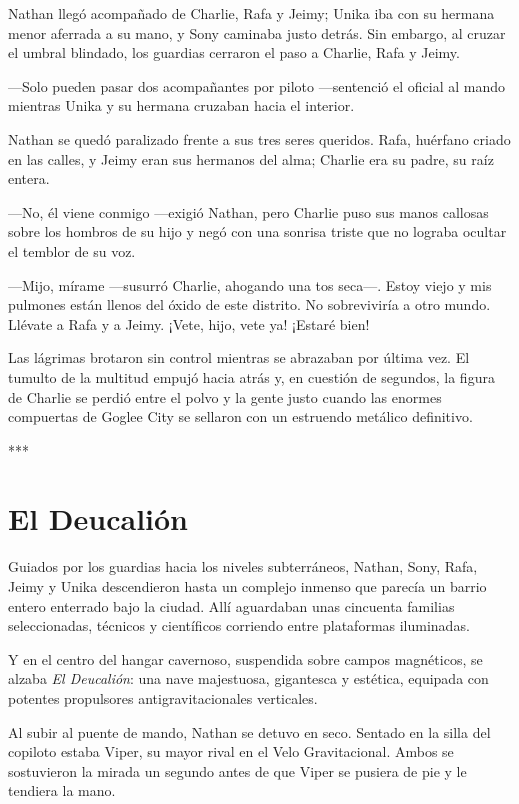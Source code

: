 \documentclass[11pt,twoside]{book}
\begin{document}
Nathan llegó acompañado de Charlie, Rafa y Jeimy; Unika iba con su hermana menor aferrada a su mano, y Sony caminaba justo detrás. Sin embargo, al cruzar el umbral blindado, los guardias cerraron el paso a Charlie, Rafa y Jeimy.

---Solo pueden pasar dos acompañantes por piloto ---sentenció el oficial al mando mientras Unika y su hermana cruzaban hacia el interior.

Nathan se quedó paralizado frente a sus tres seres queridos. Rafa, huérfano criado en las calles, y Jeimy eran sus hermanos del alma; Charlie era su padre, su raíz entera.

---No, él viene conmigo ---exigió Nathan, pero Charlie puso sus manos callosas sobre los hombros de su hijo y negó con una sonrisa triste que no lograba ocultar el temblor de su voz.

---Mijo, mírame ---susurró Charlie, ahogando una tos seca---. Estoy viejo y mis pulmones están llenos del óxido de este distrito. No sobreviviría a otro mundo. Llévate a Rafa y a Jeimy. ¡Vete, hijo, vete ya! ¡Estaré bien!

Las lágrimas brotaron sin control mientras se abrazaban por última vez. El tumulto de la multitud empujó hacia atrás y, en cuestión de segundos, la figura de Charlie se perdió entre el polvo y la gente justo cuando las enormes compuertas de Goglee City se sellaron con un estruendo metálico definitivo.

***

\section*{El Deucalión}

Guiados por los guardias hacia los niveles subterráneos, Nathan, Sony, Rafa, Jeimy y Unika descendieron hasta un complejo inmenso que parecía un barrio entero enterrado bajo la ciudad. Allí aguardaban unas cincuenta familias seleccionadas, técnicos y científicos corriendo entre plataformas iluminadas.

Y en el centro del hangar cavernoso, suspendida sobre campos magnéticos, se alzaba \textit{El Deucalión}: una nave majestuosa, gigantesca y estética, equipada con potentes propulsores antigravitacionales verticales.

Al subir al puente de mando, Nathan se detuvo en seco. Sentado en la silla del copiloto estaba Viper, su mayor rival en el Velo Gravitacional. Ambos se sostuvieron la mirada un segundo antes de que Viper se pusiera de pie y le tendiera la mano.
\end{document}
